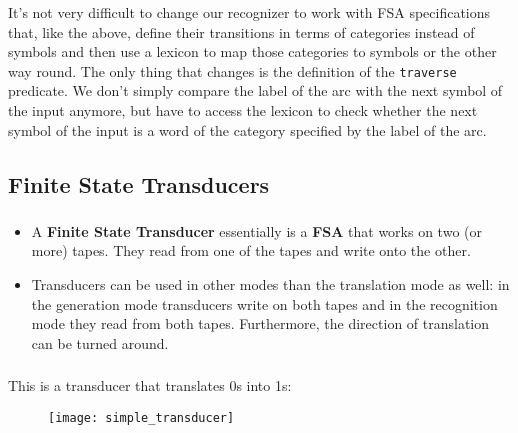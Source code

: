 \begin{frame}

	\frametitle{\insertsection}
	\framesubtitle{\insertsubsection}
	
	It's not very difficult to change our recognizer to work with FSA specifications that, like the above, define their transitions in terms of categories instead of symbols and then use a lexicon to map those categories to symbols or the other way round. The only thing that changes is the definition of the \texttt{traverse} predicate. We don't simply compare the label of the arc with the next symbol of the input anymore, but have to access the lexicon to check whether the next symbol of the input is a word of the category specified by the label of the arc.

\end{frame}


\subsection{Finite State Transducers}


\begin{frame}

	\frametitle{\insertsection}
	\framesubtitle{\insertsubsection}
	
	\begin{itemize}
		\item A \textbf{Finite State Transducer} essentially is a \textbf{FSA} that works on two (or more) tapes. They read from one of the tapes and write onto the other.
		\item Transducers can be used in other modes than the translation mode as well: in the generation mode transducers write on both tapes and in the recognition mode they read from both tapes. Furthermore, the direction of translation can be turned around.
	\end{itemize}

\end{frame}


\begin{frame}

	\frametitle{\insertsection}
	\framesubtitle{\insertsubsection}
	
	This is a transducer that translates 0s into 1s:
	
	\begin{figure}
		\texttt{[image: simple\_transducer]}
	\end{figure}


\end{frame}


